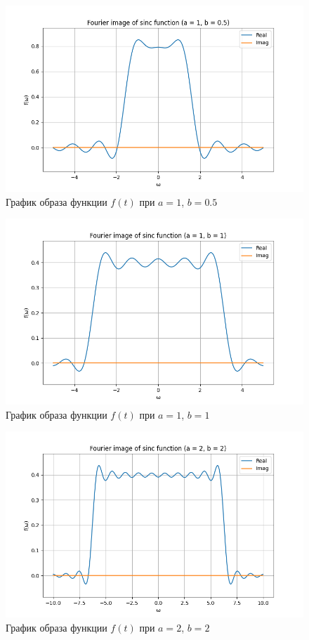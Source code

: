 \begin{figure}[ht!]
    \centering
    \includegraphics[width=\textwidth]{media/sinc_1_image.png}
    \caption{График образа функции $f(t)$ при $a = 1$, $b = 0.5$}
    \label{fig:sinc_1_image}
\end{figure}

\begin{figure}[ht!]
    \centering
    \includegraphics[width=\textwidth]{media/sinc_2_image.png}
    \caption{График образа функции $f(t)$ при $a = 1$, $b = 1$}
    \label{fig:sinc_2_image}
\end{figure}

\begin{figure}[ht!]
    \centering
    \includegraphics[width=\textwidth]{media/sinc_3_image.png}
    \caption{График образа функции $f(t)$ при $a = 2$, $b = 2$}
    \label{fig:sinc_3_image}
\end{figure}

